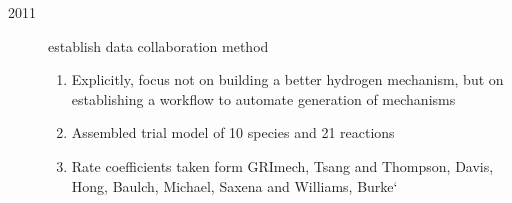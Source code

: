 \documentclass[preprint,3p,times,twocolumn]{elsarticle}
\begin{document}
\begin{description}
\begin{enumerate}
                \end{enumerate}
            \item[2011] \citet{YouPF11} establish data collaboration method
                \begin{enumerate}
                    \item Explicitly, focus not on building a better hydrogen mechanism, but on establishing a workflow to automate generation of mechanisms
                    \item Assembled trial model of 10 species and 21 reactions 
                    \item Rate coefficients taken form GRImech, Tsang and Thompson, Davis, Hong, Baulch, Michael, Saxena and Williams, Burke`
                \end{enumerate}
                        

\end{description}
\end{document}
